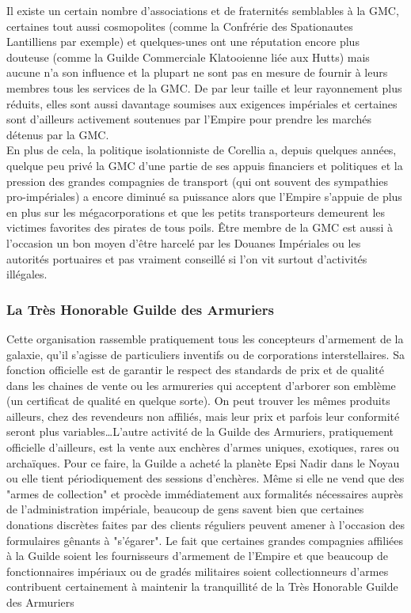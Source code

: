 \documentclass[twoside]{article}
\begin{document}
Il existe un certain nombre d'associations et de fraternités semblables à la GMC, certaines tout aussi cosmopolites (comme la Confrérie des Spationautes Lantilliens par exemple) et quelques-unes ont une réputation encore plus douteuse (comme la Guilde Commerciale Klatooienne liée aux Hutts)  mais aucune n'a son influence et la plupart ne sont pas en mesure de fournir à leurs membres tous les services de la GMC. De par leur taille et leur rayonnement plus réduits, elles sont aussi davantage soumises aux exigences impériales et certaines sont d'ailleurs activement soutenues par l'Empire pour prendre les marchés détenus par la GMC.\\

En plus de cela, la politique isolationniste de Corellia a, depuis quelques années, quelque peu privé la GMC d'une partie de ses appuis financiers et politiques et la pression des grandes compagnies de transport (qui ont souvent des sympathies pro-impériales) a encore diminué sa puissance alors que l'Empire s'appuie de plus en plus sur les mégacorporations et que les petits transporteurs demeurent les victimes favorites des pirates de tous poils. Être membre de la GMC est aussi à l'occasion un bon moyen d'être harcelé par les Douanes Impériales ou les autorités portuaires et pas vraiment conseillé si l'on vit surtout d'activités illégales.

\subsubsection{La Très Honorable Guilde des Armuriers}
Cette organisation rassemble pratiquement tous les concepteurs d'armement de la galaxie, qu'il s'agisse de particuliers inventifs ou de corporations interstellaires. Sa fonction officielle est de garantir le respect des standards de prix et de qualité dans les chaines de vente ou les armureries qui acceptent d'arborer son emblème (un certificat de qualité en quelque sorte). On peut trouver les mêmes produits ailleurs, chez des revendeurs non affiliés,  mais leur prix et parfois leur conformité seront plus variables\ldots L'autre activité de la Guilde des Armuriers, pratiquement officielle d'ailleurs, est la vente aux enchères d'armes uniques, exotiques, rares ou archaïques. Pour ce faire, la Guilde a acheté la planète Epsi Nadir dans le Noyau ou elle tient périodiquement des sessions d'enchères. Même si elle ne vend que des "armes de collection" et procède immédiatement aux formalités nécessaires auprès de l'administration impériale, beaucoup de gens savent bien que certaines donations discrètes faites par des clients réguliers peuvent amener à l'occasion des formulaires gênants à "s'égarer". Le fait que certaines grandes compagnies affiliées à la Guilde soient les fournisseurs d'armement de l'Empire et que beaucoup de fonctionnaires impériaux ou de gradés militaires soient collectionneurs d'armes contribuent certainement à maintenir la tranquillité de la Très Honorable Guilde des Armuriers
\end{document}
